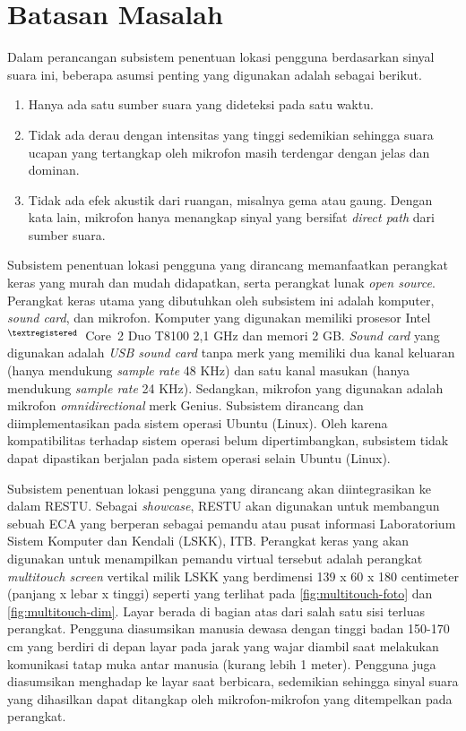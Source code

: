 \section{Batasan Masalah}
\label{sec:batasan}

Dalam perancangan subsistem penentuan lokasi pengguna berdasarkan sinyal suara ini, beberapa asumsi penting yang digunakan adalah sebagai berikut.

\begin{enumerate}
\item Hanya ada satu sumber suara yang dideteksi pada satu waktu.
\item Tidak ada derau dengan intensitas yang tinggi sedemikian sehingga suara ucapan yang tertangkap oleh mikrofon masih terdengar dengan jelas dan dominan.
\item Tidak ada efek akustik dari ruangan, misalnya gema atau gaung. Dengan kata lain, mikrofon hanya menangkap sinyal yang bersifat \textit{direct path} dari sumber suara.
\end{enumerate}

Subsistem penentuan lokasi pengguna yang dirancang memanfaatkan perangkat keras yang murah dan mudah didapatkan, serta perangkat lunak \textit{open source}. Perangkat keras utama yang dibutuhkan oleh subsistem ini adalah komputer, \textit{sound card}, dan mikrofon. Komputer yang digunakan memiliki prosesor Intel$^{\small{\textregistered}}$~Core\texttrademark~2 Duo T8100 2,1 GHz dan memori 2 GB. \textit{Sound card} yang digunakan adalah \textit{USB sound card} tanpa merk yang memiliki dua kanal keluaran (hanya mendukung \textit{sample rate} 48 KHz) dan satu kanal masukan (hanya mendukung \textit{sample rate} 24 KHz). Sedangkan, mikrofon yang digunakan adalah mikrofon \textit{omnidirectional} merk Genius. Subsistem dirancang dan diimplementasikan pada sistem operasi Ubuntu (Linux). Oleh karena kompatibilitas terhadap sistem operasi belum dipertimbangkan, subsistem tidak dapat dipastikan berjalan pada sistem operasi selain Ubuntu (Linux).

Subsistem penentuan lokasi pengguna yang dirancang akan diintegrasikan ke dalam RESTU. Sebagai \textit{showcase}, RESTU akan digunakan untuk membangun sebuah ECA yang berperan sebagai pemandu atau pusat informasi Laboratorium Sistem Komputer dan Kendali (LSKK), ITB. Perangkat keras yang akan digunakan untuk menampilkan pemandu virtual tersebut adalah perangkat \textit{multitouch screen} vertikal milik LSKK yang berdimensi 139 x 60 x 180 centimeter (panjang x lebar x tinggi) seperti yang terlihat pada \autoref{fig:multitouch-foto} dan \autoref{fig:multitouch-dim}. Layar berada di bagian atas dari salah satu sisi terluas perangkat. Pengguna diasumsikan manusia dewasa dengan tinggi badan 150-170 cm yang berdiri di depan layar pada jarak yang wajar diambil saat melakukan komunikasi tatap muka antar manusia (kurang lebih 1 meter). Pengguna juga diasumsikan menghadap ke layar saat berbicara, sedemikian sehingga sinyal suara yang dihasilkan dapat ditangkap oleh mikrofon-mikrofon yang ditempelkan pada perangkat.
